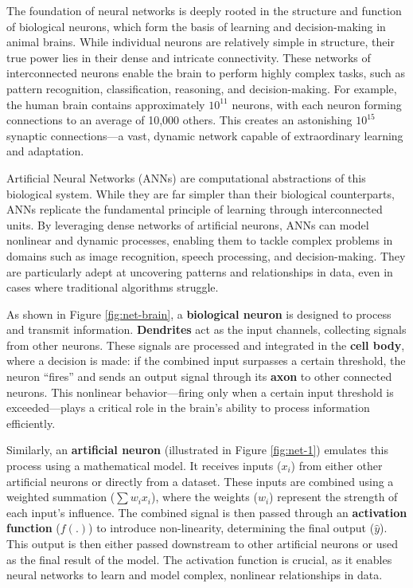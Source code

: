 \documentclass[
]{book}
\theoremstyle{definition}
\theoremstyle{definition}
\theoremstyle{definition}
\theoremstyle{definition}
\theoremstyle{remark}
\begin{document}
The foundation of neural networks is deeply rooted in the structure and function of biological neurons, which form the basis of learning and decision-making in animal brains. While individual neurons are relatively simple in structure, their true power lies in their dense and intricate connectivity. These networks of interconnected neurons enable the brain to perform highly complex tasks, such as pattern recognition, classification, reasoning, and decision-making. For example, the human brain contains approximately \(10^{11}\) neurons, with each neuron forming connections to an average of 10,000 others. This creates an astonishing \(10^{15}\) synaptic connections---a vast, dynamic network capable of extraordinary learning and adaptation.

Artificial Neural Networks (ANNs) are computational abstractions of this biological system. While they are far simpler than their biological counterparts, ANNs replicate the fundamental principle of learning through interconnected units. By leveraging dense networks of artificial neurons, ANNs can model nonlinear and dynamic processes, enabling them to tackle complex problems in domains such as image recognition, speech processing, and decision-making. They are particularly adept at uncovering patterns and relationships in data, even in cases where traditional algorithms struggle.

As shown in Figure \ref{fig:net-brain}, a \textbf{biological neuron} is designed to process and transmit information. \textbf{Dendrites} act as the input channels, collecting signals from other neurons. These signals are processed and integrated in the \textbf{cell body}, where a decision is made: if the combined input surpasses a certain threshold, the neuron ``fires'' and sends an output signal through its \textbf{axon} to other connected neurons. This nonlinear behavior---firing only when a certain input threshold is exceeded---plays a critical role in the brain's ability to process information efficiently.

Similarly, an \textbf{artificial neuron} (illustrated in Figure \ref{fig:net-1}) emulates this process using a mathematical model. It receives inputs (\(x_i\)) from either other artificial neurons or directly from a dataset. These inputs are combined using a weighted summation (\(\sum w_i x_i\)), where the weights (\(w_i\)) represent the strength of each input's influence. The combined signal is then passed through an \textbf{activation function} (\(f(.)\)) to introduce non-linearity, determining the final output (\(\hat{y}\)). This output is then either passed downstream to other artificial neurons or used as the final result of the model. The activation function is crucial, as it enables neural networks to learn and model complex, nonlinear relationships in data.
\end{document}
